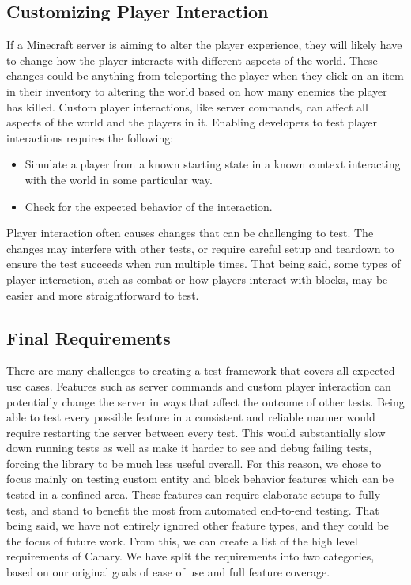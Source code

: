 \documentclass{article}
\begin{document}
\begin{onehalfspacing}
\subsection{Customizing Player Interaction}

If a Minecraft server is aiming to alter the player experience, they
will likely have to change how the player interacts with different
aspects of the world. These changes could be anything from teleporting
the player when they click on an item in their inventory to altering the
world based on how many enemies the player has killed. Custom player
interactions, like server commands, can affect all aspects of the world
and the players in it. Enabling developers to test player interactions
requires the following:

\begin{itemize}
\item
  Simulate a player from a known starting state in a known context
  interacting with the world in some particular way.
\item
  Check for the expected behavior of the interaction.
\end{itemize}

Player interaction often causes changes that can be challenging to test.
The changes may interfere with other tests, or require careful setup and
teardown to ensure the test succeeds when run multiple times. That being
said, some types of player interaction, such as combat or how players
interact with blocks, may be easier and more straightforward to test.

\subsection{Final Requirements}

There are many challenges to creating a test framework that covers all
expected use cases. Features such as server commands and custom player
interaction can potentially change the server in ways that affect the
outcome of other tests. Being able to test every possible feature in a
consistent and reliable manner would require restarting the server
between every test. This would substantially slow down running tests as
well as make it harder to see and debug failing tests, forcing the
library to be much less useful overall. For this reason, we chose to
focus mainly on testing custom entity and block behavior features which
can be tested in a confined area. These features can require elaborate
setups to fully test, and stand to benefit the most from automated
end-to-end testing. That being said, we have not entirely ignored other
feature types, and they could be the focus of future work. From this, we
can create a list of the high level requirements of Canary. We have
split the requirements into two categories, based on our original goals
of ease of use and full feature coverage.


\end{onehalfspacing}
\end{document}
